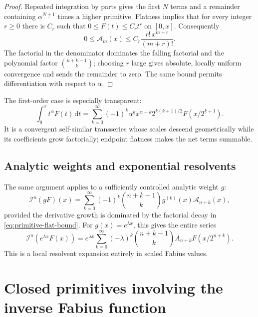 \documentclass[11pt]{article}
\theoremstyle{definition}
\theoremstyle{remark}
\newcommand{\dd}{\,\mathrm d}
\newcommand{\Iop}{\mathcal I}
\newcommand{\fall}[2]{#1^{\underline{#2}}}
\begin{document}
\begin{proof}
Repeated integration by parts gives the first \(N\) terms and a remainder containing
\(\fall{\alpha}{N+1}\) times a higher primitive.  Flatness implies that for every
integer \(r\ge0\) there is \(C_r\) such that \(0\le F(t)\le C_rt^r\) on \([0,x]\).
Consequently
\begin{equation}
 0\le\mathcal A_m(x)
 \le C_r\frac{r!\,x^{m+r}}{(m+r)!}.                       \label{eq:primitive-flat-bound}
\end{equation}
The factorial in the denominator dominates the falling factorial and the polynomial
factor \(\binom{n+k-1}{k}\); choosing \(r\) large gives absolute, locally uniform
convergence and sends the remainder to zero.  The same bound permits differentiation
with respect to \(\alpha\).
\end{proof}

The first-order case is especially transparent:
\begin{equation}
 \int_0^xt^\alpha F(t)\dd t
 =\sum_{k=0}^{\infty}(-1)^k\fall{\alpha}{k}
   x^{\alpha-k}2^{k(k+1)/2}F(x/2^{k+1}).                  \label{eq:complex-first-primitive}
\end{equation}
It is a convergent self-similar transseries whose scales descend geometrically while its
coefficients grow factorially; endpoint flatness makes the net terms summable.

\subsection{Analytic weights and exponential resolvents}

The same argument applies to a sufficiently controlled analytic weight \(g\):
\begin{equation}
 \Iop^n(gF)(x)
 =\sum_{k=0}^{\infty}(-1)^k\binom{n+k-1}{k}
   g^{(k)}(x)\mathcal A_{n+k}(x),                          \label{eq:analytic-weight}
\end{equation}
provided the derivative growth is dominated by the factorial decay in
\eqref{eq:primitive-flat-bound}.  For \(g(x)=e^{\lambda x}\), this gives the entire
series
\begin{equation}
 \Iop^n(e^{\lambda x}F(x))
 =e^{\lambda x}\sum_{k=0}^{\infty}(-\lambda)^k
   \binom{n+k-1}{k}A_{n+k}F(x/2^{n+k}).                   \label{eq:exponential-weight}
\end{equation}
This is a local resolvent expansion entirely in scaled Fabius values.

\section{Closed primitives involving the inverse Fabius function}
\end{document}
